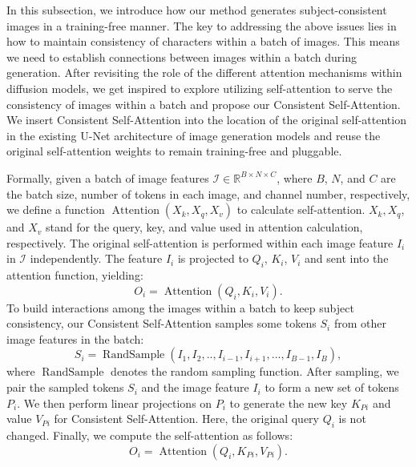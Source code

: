 \documentclass{article} %
\newcommand{\nameofsa}{Consistent Self-Attention}
\begin{document}
In this subsection, we introduce how our method generates subject-consistent images in a training-free manner. 
%
The key to addressing the above issues lies in how to maintain consistency of characters within a batch of images.
%
This means we need to establish connections between images within a batch during generation.
%
After revisiting the role of the different attention mechanisms within diffusion models, we get inspired to explore utilizing self-attention to serve the consistency of images within a batch and propose our \nameofsa{}. 
%
We insert \nameofsa{} into the location of the original self-attention in the existing U-Net architecture of image generation models and reuse the original self-attention weights to remain training-free and pluggable. 

Formally, given a batch of image features $\mathcal{I} \in \mathbb{R}^{B \times N \times C}$, where $B$, $N$, and $C$ are the batch size, number of tokens in each image, and channel number, respectively, we define a function $\operatorname{Attention} ( X_k, X_q, X_v )$ to calculate self-attention. $X_k, X_q$, and $X_v$ stand for the query, key, and value used in attention calculation, respectively. 
%
The original self-attention is performed within each image feature $I_i$ in $\mathcal{I}$ independently.
The feature $I_i$  is projected to $Q_i$, $K_i$, $V_i$ and sent into the attention function, yielding:
\begin{equation}
    O_i = \operatorname{Attention}\left (Q_i,K_i,V_i\right ).
\end{equation}
%
To build interactions among the images within a batch to keep subject consistency, our \nameofsa{} samples some tokens $S_i$ from other image features in the batch:
\begin{equation}
    S_i = \operatorname{RandSample}\left (I_1, I_2, .., I_{i-1}, I_{i+1}, ..., I_{B-1}, I_{B}\right ),
\end{equation}
where $\operatorname{RandSample}$ denotes the random sampling function.
After sampling, we pair the sampled tokens $S_i$ and the image feature  $I_i$ to form a new set of tokens $P_i$.
%
We then perform linear projections on $P_i$ to generate the new key $K_{Pi}$ and value $V_{Pi}$ for \nameofsa{}.
Here, the original query $Q_{i}$ is not changed.
Finally, we compute the self-attention as follows:
\begin{equation}
    O_i = \operatorname{Attention}\left (Q_i, K_{Pi}, V_{Pi}\right ).
\end{equation}
\end{document}
